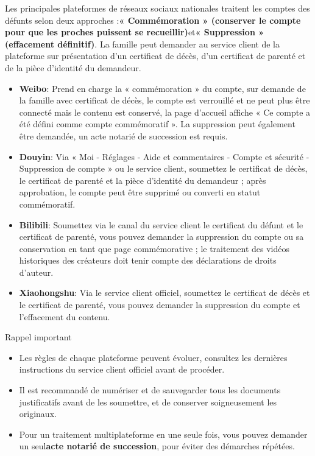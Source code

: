 
Les principales plateformes de réseaux sociaux nationales traitent les comptes des défunts selon deux approches :\textbf{« Commémoration » (conserver le compte pour que les proches puissent se recueillir)}et\textbf{« Suppression » (effacement définitif)}. La famille peut demander au service client de la plateforme sur présentation d'un certificat de décès, d'un certificat de parenté et de la pièce d'identité du demandeur.

\begin{itemize}
  \item \textbf{Weibo}: Prend en charge la « commémoration » du compte, sur demande de la famille avec certificat de décès, le compte est verrouillé et ne peut plus être connecté mais le contenu est conservé, la page d'accueil affiche « Ce compte a été défini comme compte commémoratif ». La suppression peut également être demandée, un acte notarié de succession est requis.
  \item \textbf{Douyin}: Via « Moi - Réglages - Aide et commentaires - Compte et sécurité - Suppression de compte » ou le service client, soumettez le certificat de décès, le certificat de parenté et la pièce d'identité du demandeur ; après approbation, le compte peut être supprimé ou converti en statut commémoratif.
  \item \textbf{Bilibili}: Soumettez via le canal du service client le certificat du défunt et le certificat de parenté, vous pouvez demander la suppression du compte ou sa conservation en tant que page commémorative ; le traitement des vidéos historiques des créateurs doit tenir compte des déclarations de droits d'auteur.
  \item \textbf{Xiaohongshu}: Via le service client officiel, soumettez le certificat de décès et le certificat de parenté, vous pouvez demander la suppression du compte et l'effacement du contenu.
\end{itemize}

\begin{tcbinfo}{Rappel important}
\begin{itemize}
  \item Les règles de chaque plateforme peuvent évoluer, consultez les dernières instructions du service client officiel avant de procéder.
  \item Il est recommandé de numériser et de sauvegarder tous les documents justificatifs avant de les soumettre, et de conserver soigneusement les originaux.
  \item Pour un traitement multiplateforme en une seule fois, vous pouvez demander un seul\textbf{acte notarié de succession}, pour éviter des démarches répétées.
\end{itemize}

\end{tcbinfo}

